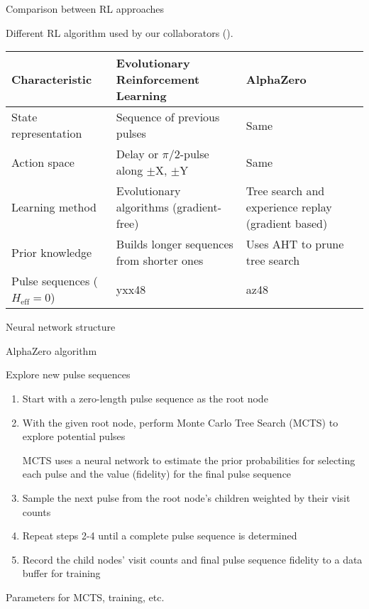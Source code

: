 \documentclass{beamer}
\begin{document}
\begin{frame}{Comparison between RL approaches}

Different RL algorithm used by our collaborators (\cite{peng2021deep}).

\begin{table}
\centering
\begin{footnotesize}
\begin{tabular}{p{}|p{}|p{}}
    Characteristic & Evolutionary Reinforcement Learning & AlphaZero \\
    \hline
    State representation & Sequence of previous pulses & Same \\
    \hline
    Action space & Delay or $\pi/2$-pulse along $\pm$X, $\pm$Y & Same \\
    \hline
    Learning method & Evolutionary algorithms (gradient-free) & Tree search and experience replay (gradient based) \\
    \hline
    Prior knowledge & Builds longer sequences from shorter ones & Uses AHT to prune tree search \\
    \hline
    Pulse sequences ($H_\text{eff} = 0$) & yxx48 & az48
\end{tabular}
\end{footnotesize}
\end{table}

\end{frame}

\begin{frame}{Neural network structure}

\begin{figure}
\centering
\scalebox{.6}{

}
\end{figure}

\end{frame}

\begin{frame}{AlphaZero algorithm}


Explore new pulse sequences

\begin{enumerate}

\item
Start with a zero-length pulse sequence as the root node
\item
With the given root node, perform Monte Carlo Tree Search (MCTS) to
explore potential pulses

MCTS uses a neural network to estimate the prior probabilities for
selecting each pulse and the value (fidelity) for the final pulse
sequence

\item
Sample the next pulse from the root node's children weighted by
their visit counts
\item
Repeat steps 2-4 until a complete pulse sequence is determined
\item
Record the child nodes' visit counts and final pulse sequence
fidelity to a data buffer for training
\end{enumerate}

Parameters for MCTS, training, etc.
\end{frame}
\end{document}
